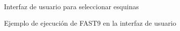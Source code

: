 \documentclass{report}
\begin{document}
\begin{figure}
	\caption{\label{fig:interfaz} Interfaz de usuario para seleccionar esquinas}
\end{figure}

\begin{figure}
	\caption{\label{fig:fast9} Ejemplo de ejecución de FAST9 en la interfaz de usuario}
\end{figure}



\nocite{*}
\end{document}
